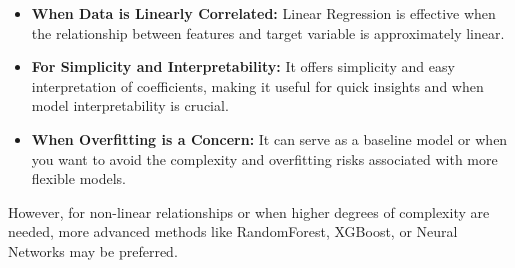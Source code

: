 \begin{itemize}
    \item \textbf{When Data is Linearly Correlated:} Linear Regression is effective when the relationship between features and target variable is approximately linear.
    \item \textbf{For Simplicity and Interpretability:} It offers simplicity and easy interpretation of coefficients, making it useful for quick insights and when model interpretability is crucial.
    \item \textbf{When Overfitting is a Concern:} It can serve as a baseline model or when you want to avoid the complexity and overfitting risks associated with more flexible models.
\end{itemize}

However, for non-linear relationships or when higher degrees of complexity are needed, more advanced methods like RandomForest, XGBoost, or Neural Networks may be preferred.

\clearpage